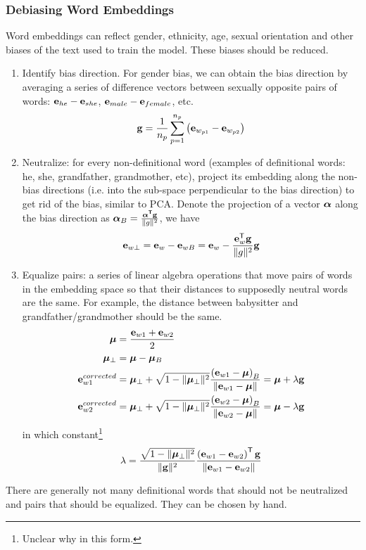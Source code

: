 \subsubsection{Debiasing Word Embeddings}
Word embeddings can reflect gender, ethnicity, age, sexual orientation and other biases of the text used to train the model. These biases should be reduced.
\begin{enumerate}
  \item Identify bias direction. For gender bias, we can obtain the bias direction by averaging a series of difference vectors between sexually opposite pairs of words: $\mathbf{e}_{he}-\mathbf{e}_{she}$, $\mathbf{e}_{male}-\mathbf{e}_{female}$, etc.  
  \[\mathbf{\boldsymbol{g}}=\frac{1}{n_p}\displaystyle\sum_{p=1}^{n_p}\left(\mathbf{e}_{w_{p1}}-\mathbf{e}_{w_{p2}}\right)\]
  \item Neutralize: for every non-definitional word (examples of definitional words: he, she, grandfather, grandmother, etc), project its embedding along the non-bias directions (i.e. into the sub-space perpendicular to the bias direction) to get rid of the bias, similar to PCA. Denote the projection of a vector $\mathbf{\boldsymbol{\alpha}}$ along the bias direction as $\mathbf{\boldsymbol{\alpha}}_B=\frac{\mathbf{\boldsymbol{\alpha^{\mathsf{T}}g}}}{\Vert g\Vert^2}$, we have  
  \[\mathbf{\boldsymbol{e}}_{w\perp}=\mathbf{e}_{w}-\mathbf{\boldsymbol{e}}_{wB}=\mathbf{e}_{w}-\frac{\mathbf{e}_{w}^{\mathsf{T}}\mathbf{\boldsymbol{g}}}{\Vert g\Vert^2}\mathbf{\boldsymbol{g}}\]
  \item Equalize pairs: a series of linear algebra operations that move pairs of words in the embedding space so that their distances to supposedly neutral words are the same. For example, the distance between babysitter and grandfather/grandmother should be the same. 
  \begin{align*}
    \mathbf{\boldsymbol{\mu}}&=\frac{\mathbf{e}_{w1}+\mathbf{e}_{w2}}{2}\\
    \mathbf{\boldsymbol{\mu}}_{\perp}&=\mathbf{\boldsymbol{\mu}}-\mathbf{\boldsymbol{\mu}}_B\\
    \mathbf{e}_{w1}^{corrected}&=\mathbf{\boldsymbol{\mu}}_{\perp}+\sqrt{1-\Vert\mathbf{\boldsymbol{\mu}}_{\perp}\Vert^2}\frac{\left(\mathbf{e}_{w1}-\mathbf{\boldsymbol{\mu}}\right)_B}{\Vert\mathbf{e}_{w1}-\mathbf{\boldsymbol{\mu}}\Vert}=\mathbf{\boldsymbol{\mu}}+\lambda\mathbf{\boldsymbol{g}}\\
    \mathbf{e}_{w2}^{corrected}&=\mathbf{\boldsymbol{\mu}}_{\perp}+\sqrt{1-\Vert\mathbf{\boldsymbol{\mu}}_{\perp}\Vert^2}\frac{\left(\mathbf{e}_{w2}-\mathbf{\boldsymbol{\mu}}\right)_B}{\Vert\mathbf{e}_{w2}-\mathbf{\boldsymbol{\mu}}\Vert}=\mathbf{\boldsymbol{\mu}}-\lambda\mathbf{\boldsymbol{g}}\\
  \end{align*}
  in which constant\footnote{Unclear why in this form.}
  \[\lambda=\frac{\sqrt{1-\Vert\mathbf{\boldsymbol{\mu}}_{\perp}\Vert^2}}{\Vert\mathbf{\boldsymbol{g}}\Vert^2}\frac{\left(\mathbf{e}_{w1}-\mathbf{e}_{w2}\right)^{\mathsf{T}}\mathbf{\boldsymbol{g}}}{\Vert\mathbf{e}_{w1}-\mathbf{e}_{w2}\Vert}\]
\end{enumerate}
There are generally not many definitional words that should not be neutralized and pairs that should be equalized. They can be chosen by hand.
